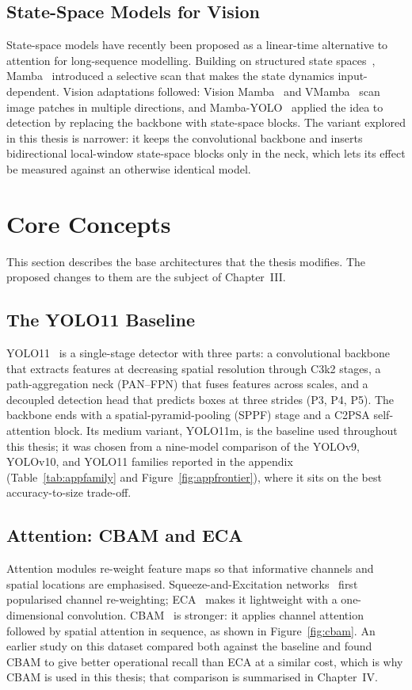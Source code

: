 \subsection{State-Space Models for Vision}
State-space models have recently been proposed as a linear-time alternative to
attention for long-sequence modelling. Building on structured state
spaces~\cite{gu2022s4}, Mamba~\cite{gu2023mamba} introduced a selective scan that
makes the state dynamics input-dependent. Vision adaptations followed: Vision
Mamba~\cite{zhu2024visionmamba} and VMamba~\cite{liu2024vmamba} scan image patches in
multiple directions, and Mamba-YOLO~\cite{wang2025mambayolo} applied the idea to
detection by replacing the backbone with state-space blocks. The variant explored in
this thesis is narrower: it keeps
the convolutional backbone and inserts bidirectional local-window state-space
blocks only in the neck, which lets its effect be measured against an otherwise
identical model.

\section{Core Concepts}
This section describes the base architectures that the thesis modifies. The
proposed changes to them are the subject of Chapter~III.

\subsection{The YOLO11 Baseline}
YOLO11~\cite{jocher2024yolo11} is a single-stage detector with three parts: a
convolutional backbone that extracts features at decreasing spatial resolution
through C3k2 stages, a path-aggregation neck (PAN--FPN) that fuses features across
scales, and a decoupled detection head that predicts boxes at three strides (P3,
P4, P5). The backbone ends with a spatial-pyramid-pooling (SPPF) stage and a
C2PSA self-attention block. Its medium variant, YOLO11m, is the baseline used
throughout this thesis; it was chosen from a nine-model comparison of the
YOLOv9, YOLOv10, and YOLO11 families reported in the appendix
(Table~\ref{tab:appfamily} and Figure~\ref{fig:appfrontier}), where it sits on
the best accuracy-to-size trade-off.

\subsection{Attention: CBAM and ECA}
Attention modules re-weight feature maps so that informative channels and spatial
locations are emphasised. Squeeze-and-Excitation networks~\cite{hu2018senet} first
popularised channel re-weighting; ECA~\cite{wang2020eca} makes it lightweight with a
one-dimensional convolution. CBAM~\cite{woo2018cbam} is stronger:
it applies channel attention followed by spatial attention in sequence, as shown in
Figure~\ref{fig:cbam}. An earlier study on this dataset compared both against the
baseline and found CBAM to give better operational recall than ECA at a similar
cost, which is why CBAM is used in this thesis; that comparison is summarised in
Chapter~IV.

